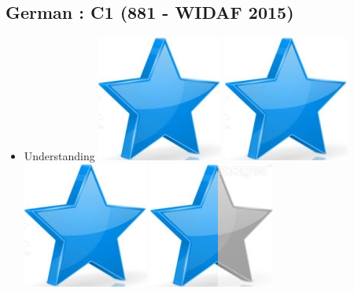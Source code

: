 \documentclass[10pt,a4paper,sans]{article}
\begin{document}
\begin{minipage}[t]{0.28\textwidth}
\begin{mdframed}[style=cadreCompetences]
        \subsection{German : C1 \newline (881 - WIDAF 2015)}
            \begin{itemize}
                \item{Understanding
                    \hfill
                    \includegraphics[scale=0.25]{img/star.png} \hspace{-0.22cm}
                    \includegraphics[scale=0.25]{img/star.png} \hspace{-0.22cm}
                    \includegraphics[scale=0.25]{img/star.png} \hspace{-0.22cm}
                    \includegraphics[scale=0.25]{img/half_star.png} \hspace{-0.22cm}
}
\end{itemize}
\end{mdframed}
\end{minipage}
\end{document}
